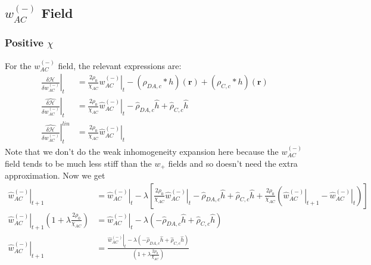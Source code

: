 \documentclass{article}
\begin{document}
    \subsection{$w_{AC}^{(-)}$ Field}
    \subsubsection{Positive $\chi$}
  For the $w_{AC}^{(-)}$ field, the relevant expressions are:
  \begin{align*}
  \left. \frac{\delta \mathcal{H}}{\delta w_{AC}^{(-)}} \right|_t &=
  \frac{2 \rho_0}{\chi_{AC}} \left. w_{AC}^{(-)} \right|_t
  - (\rho_{DA,c} \ast h)(\mathbf{r})
  + (\rho_{C,c} \ast h)(\mathbf{r}) \\
  \left. \hat{\frac{\delta \mathcal{H}}{\delta w_{AC}^{(-)}}} \right|_t &=
  \frac{2 \rho_0}{\chi_{AC}} \left. \hat{w}_{AC}^{(-)} \right|_t
  - \hat{\rho}_{DA,c} \hat{h}
  + \hat{\rho}_{C,c} \hat{h} \\
  \left.
  \hat{\frac{\delta \mathcal{H}}{\delta w_{AC}^{(-)}}}
  \right| ^{lin}_t &=
  \frac{2\rho_0}{\chi_{AC}} \left. \hat{w}_{AC}^{(-)} \right|_t
  \end{align*}
  Note that we don't do the weak inhomogeneity expansion here because the
  $w_{AC}^{(-)}$ field tends to be much less stiff than the $w_+$ fields and so
  doesn't need the extra approximation.
  Now we get
  \begin{align*}
  \left. \hat{w}_{AC}^{(-)} \right|_{t+1} &=
  \left. \hat{w}_{AC}^{(-)} \right|_t - \lambda \left[
  \frac{2\rho_0}{\chi_{AC}} \left. \hat{w}_{AC}^{(-)} \right|_t
  - \hat{\rho}_{DA,c} \hat{h}
  + \hat{\rho}_{C,c} \hat{h}
  + \frac{2\rho_0}{\chi_{AC}}
  ( \left. \hat{w}_{AC}^{(-)}\right|_{t+1}
  - \left. \hat{w}_{AC}^{(-)} \right|_t
  )
  \right] \\
  \left. \hat{w}_{AC}^{(-)} \right|_{t+1} ( 1 + \lambda \frac{2
  	\rho_0}{\chi_{AC}} ) &=
  \left. \hat{w}_{AC}^{(-)} \right|_t - \lambda \left(
  - \hat{\rho}_{DA,c} \hat{h}
  + \hat{\rho}_{C,c} \hat{h}
  \right) \\
  \left. \hat{w}_{AC}^{(-)} \right|_{t+1} &=
  \frac{
  	\left. \hat{w}_{AC}^{(-)} \right|_t - \lambda \left(
  	- \hat{\rho}_{DA,c} \hat{h}
  	+ \hat{\rho}_{C,c} \hat{h}
  	\right)
  }
  {
  	\left( 1 + \lambda \frac{2 \rho_0}{\chi_{AC}} \right)
  }
  \end{align*}
  
\end{document}
